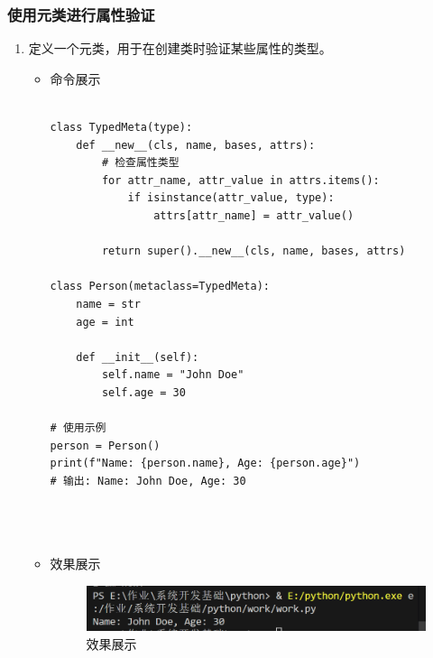 \documentclass[UTF8]{ctexart}
\begin{document}
\subsubsection{使用元类进行属性验证}

\begin{enumerate}
  \item 定义一个元类，用于在创建类时验证某些属性的类型。
  \begin{itemize}
  \item 命令展示
  \begin{verbatim}
 
class TypedMeta(type):
    def __new__(cls, name, bases, attrs):
        # 检查属性类型
        for attr_name, attr_value in attrs.items():
            if isinstance(attr_value, type):
                attrs[attr_name] = attr_value()
        
        return super().__new__(cls, name, bases, attrs)

class Person(metaclass=TypedMeta):
    name = str
    age = int

    def __init__(self):
        self.name = "John Doe"
        self.age = 30

# 使用示例
person = Person()
print(f"Name: {person.name}, Age: {person.age}")
# 输出: Name: John Doe, Age: 30


    
  \end{verbatim}

  \item 效果展示
  \begin{figure}[H]
    \centering
    \includegraphics[width=\textwidth]{25} %
    \caption{效果展示}
  
  \end{figure}
\end{itemize}
\end{enumerate}
\end{document}
